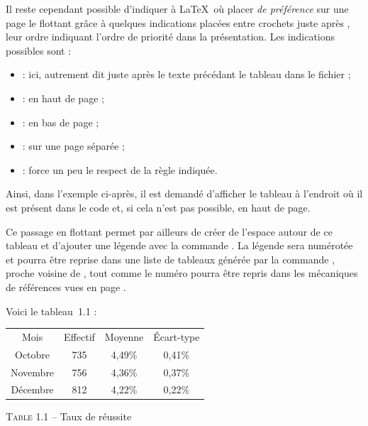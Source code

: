 Il reste cependant possible d'indiquer à \LaTeX\ où placer \emph{de préférence} sur une page le flottant grâce à quelques indications placées entre crochets juste après , leur ordre indiquant l'ordre de priorité dans la présentation. Les indications possibles sont :
\begin{itemize}
\item {} : ici, autrement dit juste après le texte précédant le tableau dans le fichier  ;
\item {} : en haut de page ;
\item {} : en bas de page ;
\item {} : sur une page séparée ;
\item \macron{\string!} : force un peu le respect de la règle indiquée. \\
\end{itemize}

Ainsi, dans l'exemple ci-après, il est demandé d'afficher le tableau à l'endroit où il est présent dans le code et, si cela n'est pas possible, en haut de page.

Ce passage en flottant permet par ailleurs de créer de l'espace autour de ce tableau et d'ajouter une légende avec la  commande . La légende sera numérotée et pourra être reprise dans une liste de tableaux générée par la commande , proche voisine de , tout comme le numéro pourra être repris dans les mécaniques de références vues en page \pageref{référence}.

\begin{codedoublevrai}
Voici le tableau~1.1 : 

\bigskip
\centering
\begin{tabular}{cccc}
Mois            & Effectif     & Moyenne      & \'{E}cart-type  \\ 
Octobre         & 735          & 4,49\%       & 0,41\%          \\
Novembre        & 756          & 4,36\%       & 0,37\%          \\
Décembre        & 812          & 4,22\%       & 0,22\%          \\ 
\end{tabular}

\vspace{\baselineskip}
\textsc{Table 1.1} -- Taux de réussite
\end{codedoublevrai}

